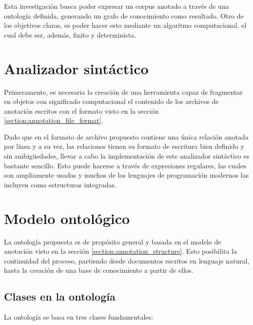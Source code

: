 \label{chapter:proposed_solution}
\vspace{-0.2in}
Esta investigación busca poder expresar un corpus anotado a través de una ontología definida, generando un grafo de conocimiento como resultado. Otro de los objetivos claros, es poder hacer esto mediante un algoritmo computacional, el cual debe ser, además, finito y determinista. 

\section{Analizador sintáctico}
Primeramente, es necesaria la creación de una herramienta capaz de fragmentar en objetos con significado computacional el contenido de los archivos de anotación escritos con el formato visto en la sección \ref{section:annotation_file_format}.

Dado que en el formato de archivo propuesto contiene una única relación anotada por línea y a su vez, las relaciones tienen su formato de escritura bien definido y sin ambigüedades, llevar a cabo la implementación de este analizador sintáctico es bastante sencillo. Esto puede hacerse a través de expresiones regulares, las cuales son ampliamente usadas y muchos de los lenguajes de programación modernos las incluyen como estructuras integradas.

\section{Modelo ontológico}
La ontología propuesta es de propósito general y basada en el modelo de anotación visto en la sección \ref{section:annotation_structure}. Esto posibilita la continuidad del proceso, partiendo desde documentos escritos en lenguaje natural, hasta la creación de una base de conocimiento a partir de ellos.

\subsection{Clases en la ontología}
La ontología se basa en tres clases fundamentales:

